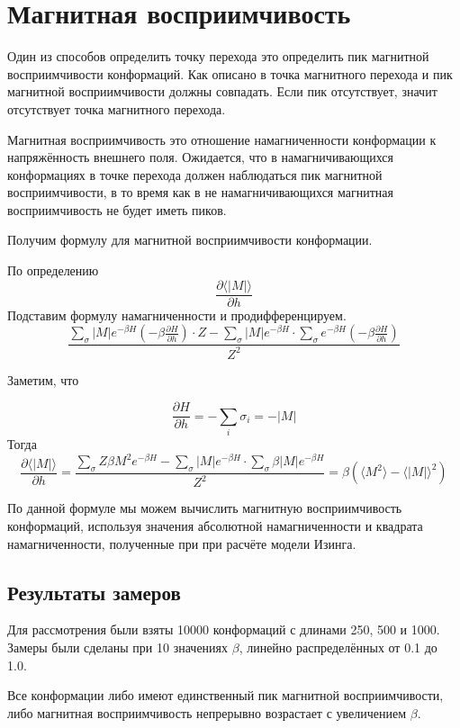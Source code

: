 \section{Магнитная восприимчивость}
Один из способов определить точку перехода это определить пик магнитной восприимчивости конформаций. Как описано в \cite{swendsen} точка магнитного перехода и пик магнитной восприимчивости должны совпадать. Если пик отсутствует, значит отсутствует точка магнитного перехода.

Магнитная восприимчивость это отношение намагниченности конформации к напряжённость внешнего поля. Ожидается, что в намагничивающихся конформациях в точке перехода должен наблюдаться пик магнитной восприимчивости, в то время как в не намагничивающихся магнитная восприимчивость не будет иметь пиков.

Получим формулу для магнитной восприимчивости конформации.

По определению
\[
	\frac{\partial\langle |M|\rangle}{\partial h}
\]
Подставим формулу намагниченности и продифференцируем.
\[
	\frac{\sum_\sigma {|M| e^{-\beta H} \left( -\beta \frac{\partial H}{\partial h}\right)} \cdot Z - \sum_\sigma {|M| e^{-\beta H}} \cdot \sum_\sigma {e^{-\beta H} \left( -\beta \frac{\partial H}{\partial h}\right)}}{Z^2}
\]

Заметим, что

\[
	\frac{\partial H}{\partial h} = -\sum_i\sigma_i = -|M|
\]
Тогда
\[
	\frac{\partial\langle |M|\rangle}{\partial h} = \frac{\sum_\sigma {Z\beta M^2 e^{-\beta H}} - \sum_\sigma {|M| e^{-\beta H}}\cdot \sum_\sigma {\beta |M| e^{-\beta H}}}{Z^2} = \beta \left(\langle M^2\rangle - \langle |M| \rangle^2 \right)
\]


По данной формуле мы можем вычислить магнитную восприимчивость конформаций, используя значения абсолютной намагниченности и квадрата намагниченности, полученные при при расчёте модели Изинга.



\subsection{Результаты замеров}
Для рассмотрения были взяты 10000 конформаций с длинами 250, 500 и 1000. Замеры были сделаны при 10 значениях $\beta$, линейно распределённых от 0.1 до 1.0.

Все конформации либо имеют единственный пик магнитной восприимчивости, либо магнитная восприимчивость непрерывно возрастает с увеличением $\beta$.

